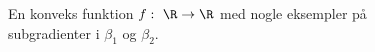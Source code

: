 \begin{figure}[H]
\centering
\scalebox{1.2}{}
\caption{En konveks funktion \(f : \ \R \rightarrow \R\) med nogle eksempler på subgradienter i \(\beta_1\) og \(\beta_2\).} \label{fig:subgradients}
\end{figure}






